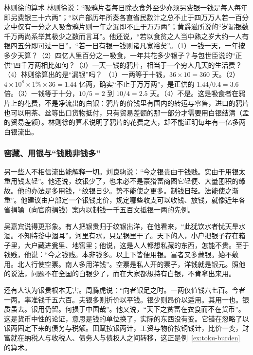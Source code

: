 \begin{example}{林则徐的算术}\label{ex:toku-lin}
林则徐说：“吸鸦片者每日除衣食外至少亦须另费银一钱是每人每年即另费银三十六两”；“以户部历年所奏各直省民数计之总不止于四万万人若一百分之中仅有一分之人吸食鸦片则一年之漏即不止于万万两”；黄爵滋所说的“岁漏银数千万两尚系举其极少之数而言耳”。他还说，“若以食贫之人当中熟之岁大约一人有银四五分即可过一日”，“若一日有银一钱则诸凡宽裕矣”\cite{xubiange}。（1）一钱一天，一年按多少天算？（2）四亿人里百分之一吸食，一年共花多少银子？与包世臣说的“正供”四千万两相比如何？（3）一天一钱的鸦片，相当于一个穷人几天的生活费？（4）林则徐算出的是“漏银”吗？
\solution （1）一两等于十钱，$36\times10=360$ 天。（2）$4\times10^8\times1\%\times36=1.44$ 亿两，确实“不止于万万两”，是正供的 $1.44/0.4=3.6$ 倍。（3）一钱等于十分，$10/5=2$ 到 $10/4=2.5$ 天。（4）不是。这是吸食者在鸦片上的花费，不是净流出的白银：鸦片的价钱里有国内的转运与零售，进口的鸦片也可以用茶、丝等出口货物抵付，只有贸易差额的那一部分才需要用白银结清（孟的贸易差额）。林则徐的算术说明了鸦片的花费之大，却不能证明每年有一亿多两白银流出。
\end{example}

\subsubsection{窖藏、用银与“钱贱非钱多”}
另一些人不相信流出能解释一切。刘良驹说：“今之银贵由于钱贱。实由于用银太重用钱太轻”。他还说，纹银少了，也未必不是豪猾富商图它轻便、大量囤积的缘故。他的办法是多用钱，“纹银日少。势不能使之更多。制钱日轻。法能使之渐重”。他建议由户部定一个银钱比价，规定哪些收支可以收钱、放钱，就像近年各省捐输（向官府捐钱）案内以制钱一千五百文抵银一两的先例\cite{xubiansheng}。

吴嘉宾说得更形象。有人把银贵归于纹银出洋，在他看来，“此犹饮水者忧天旱水涸。不知特釜中涸耳”，河里有水，只是锅里干了。天下的人，小户把银子存在箱子里，大户藏进瓮里、地窖里；他说，这是人人都想私藏的东西，怎能不贵。至于钱贱，他说：“今之钱贱。本非钱多。以上下皆便用银。富者又多藏银。始不敷用。北人行使空票。南人多用洋钱”\cite{xubiansheng}。空票是私人开的票子，洋钱就是银元。照他的说法，问题不在全国的白银少了，而在大家都想持有白银，不肯拿出来用。

还有人认为银贵根本无害。周腾虎说：“向者银足之时。一两仅值钱六七百。今者一两。率准钱千五六百。夫银多则折价以平钱。银少则昂价以适用。其用一也。银质虽去。银用仍留。何损于中国哉”。他又说，“天下之贫富在衣食而不在货币”\cite{xubiansheng}。这是货币中性的论证，意思是钱的单位换了，实际的东西没有变。它错在忽略了以银两固定下来的债务与税额。田赋按银两计，工资与物价按铜钱计，比价一变，财富就在纳税人与收税人、债务人与债权人之间转移，这正是例~\ref{ex:toku-burden} 的算术。

